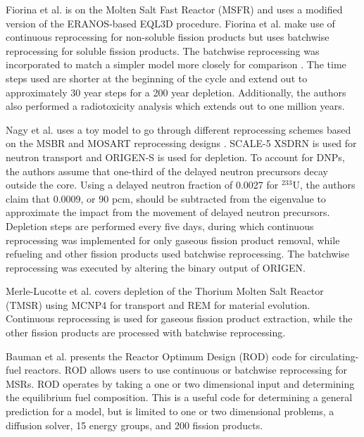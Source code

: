 Fiorina et al. \cite{fiorina_preliminary_2012} is on the Molten Salt Fast Reactor (MSFR) and uses a modified version of the ERANOS-based EQL3D procedure. Fiorina et al. make use of continuous reprocessing for non-soluble fission products but uses batchwise reprocessing for soluble fission products.
The batchwise reprocessing was incorporated to match a simpler model more closely for comparison \cite{merle-lucotte_launching_2011}. The time steps used are shorter at the beginning of the cycle and extend out to approximately 30 year steps for a 200 year depletion. Additionally, the authors also performed a radiotoxicity analysis which extends out to one million years.

Nagy et al. \cite{nagy_parametric_2008} uses a toy model to go through different reprocessing schemes based on the MSBR and MOSART reprocessing designs \cite{robertson_conceptual_1971, ignatiev_progress_2007}. SCALE-5 XSDRN\cite{noauthor_scale_2005} is used for neutron transport and ORIGEN-S is used for depletion. To account for DNPs, the authors assume that one-third of the delayed neutron precursors decay outside the core.
Using a delayed neutron fraction of 0.0027 for $^{233}$U, the authors claim that 0.0009, or 90 pcm, should be subtracted from the eigenvalue to approximate the impact from the movement of delayed neutron precursors.
Depletion steps are performed every five days, during which continuous reprocessing was implemented for only gaseous fission product removal, while refueling and other fission products used batchwise reprocessing.
The batchwise reprocessing was executed by altering the binary output of ORIGEN.

Merle-Lucotte et al. \cite{merle-lucotte_thorium_2007} covers depletion of the Thorium Molten Salt Reactor (TMSR) using MCNP4 \cite{goluoglu_software_1998} for transport and REM for material evolution. Continuous reprocessing is used for gaseous fission product extraction, while the other fission products are processed with batchwise reprocessing.

Bauman et al. \cite{h_f_bauman_rod_1971} presents the Reactor Optimum Design (ROD) code for circulating-fuel reactors.
ROD allows users to use continuous or batchwise reprocessing for MSRs. ROD operates by taking a one or two dimensional input and determining the equilibrium fuel composition. This is a useful code for determining a general prediction for a model, but is limited to one or two dimensional problems, a diffusion solver, 15 energy groups, and 200 fission products.

